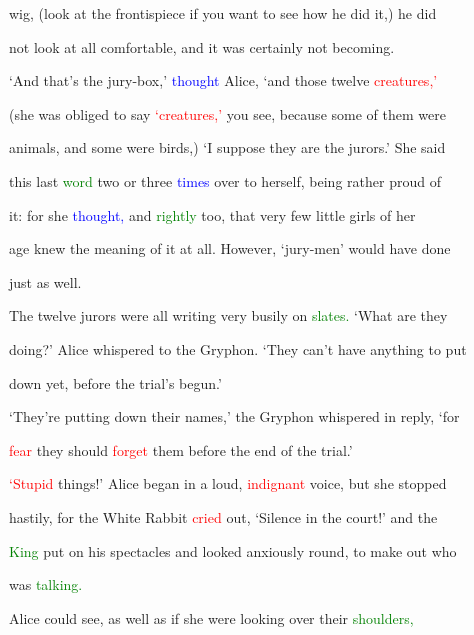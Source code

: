  wig, (look at the frontispiece if you want to see how he did it,) he did

 not look at all comfortable, and it was certainly not becoming.



 ‘And that’s the jury-box,’ \textcolor{blue}{thought} Alice, ‘and those twelve \textcolor{red}{creatures,’}

 (she was \textcolor{BurntOrange}{obliged} to say \textcolor{red}{‘creatures,’} you see, because some of them were

 animals, and some were birds,) ‘I suppose they are the jurors.’ She said

 this last \textcolor{green}{word} two or three \textcolor{blue}{times} over to herself, being rather \textcolor{BurntOrange}{proud} of

 it: for she \textcolor{blue}{thought,} and \textcolor{green}{rightly} too, that very few little girls of her

 age knew the meaning of it at all. However, ‘jury-men’ would have done

 just as well.



 The twelve jurors were all writing very busily on \textcolor{green}{slates.} ‘What are they

 doing?’ Alice whispered to the Gryphon. ‘They can’t have anything to put

 down yet, before the trial’s begun.’



 ‘They’re putting down their names,’ the Gryphon whispered in reply, ‘for

 \textcolor{red}{fear} they should \textcolor{red}{forget} them before the end of the trial.’



 \textcolor{red}{‘Stupid} things!’ Alice began in a loud, \textcolor{red}{indignant} voice, but she stopped

 hastily, for the \textcolor{BurntOrange}{White} Rabbit \textcolor{red}{cried} out, ‘Silence in the \textcolor{BurntOrange}{court!’} and the

 \textcolor{green}{King} put on his \textcolor{BurntOrange}{spectacles} and looked anxiously round, to make out who

 was \textcolor{green}{talking.}



 Alice could see, as well as if she were looking over their \textcolor{green}{shoulders,}

